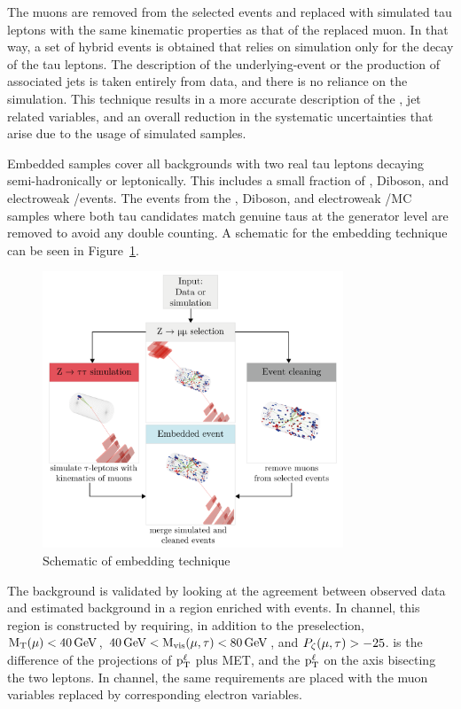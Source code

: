 The muons are removed from the selected events and replaced with simulated tau leptons with the same kinematic properties as that of the replaced muon. In that way, a set of hybrid events is obtained that relies on simulation only for the decay of the tau leptons. The description of the underlying-event or the production of associated jets is taken entirely from data, and there is no reliance on the simulation. This technique results in a more accurate description of the \ptvecmiss, jet related variables, and an overall reduction in the systematic uncertainties that arise due to the usage of simulated samples.

Embedded samples cover all backgrounds with two real tau leptons decaying semi-hadronically or leptonically. This includes a small fraction of \ttbar, Diboson, and electroweak \PW/\PZ events. The events from the \ttbar, Diboson, and electroweak \PW/\PZ MC samples where both tau candidates match genuine taus at the generator level are removed to avoid any double counting. A schematic for the embedding technique can be seen in Figure~\ref{fig:embedding}.

\begin{figure}[htbp!]
  \centering
  \includegraphics[width=0.8\textwidth]{plots/chapter7/emb.png}
  \caption{Schematic of embedding technique}
  \label{fig:embedding}
\end{figure}

The \Ztt background is validated by looking at the agreement between observed data and estimated background in a region enriched with \Ztt events. In \muhad channel, this region is constructed by requiring, in addition to the preselection, $\text{M}_\mathrm{T}(\mu) < 40 \,\text{Ge\hspace{-.08em}V}$, $40 \,\text{Ge\hspace{-.08em}V} < \text{M}_{\text{vis}}(\mu, \tau) < 80 \,\text{Ge\hspace{-.08em}V}$, and $P_{\zeta}(\mu, \tau) > -25$. \pzeta is the difference of the projections of $\text{p}_\text{T}^{\ell}$ plus MET, and the $\text{p}_\text{T}^{\ell}$ on the axis bisecting the two leptons. In \ehad channel, the same requirements are placed with the muon variables replaced by corresponding electron variables.

